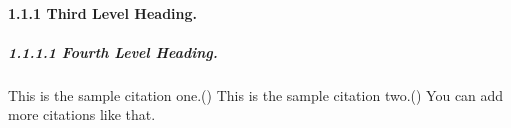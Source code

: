 \documentclass[a4paper,12pt]{article}
\begin{document}
\paragraph{1.1.1 Third Level Heading.}
\lipsum[3]

\subparagraph{1.1.1.1 Fourth Level Heading.}
\lipsum[4]


\noindent This is the sample citation one.(\cite{clarke2001business}) This is the sample citation two.(\cite{lamport1986latex}) You can add more citations like that. 


\printbibliography  %
\end{document}
